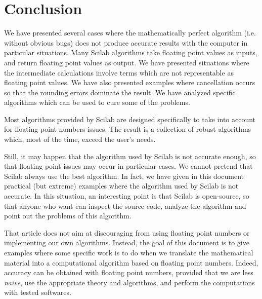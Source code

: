 %

\section{Conclusion}

We have presented several cases where the mathematically perfect 
algorithm (i.e. without obvious bugs) does not produce accurate results 
with the computer in particular situations.
Many Scilab algorithms take floating point values as inputs,
and return floating point values as output. We have presented situations 
where the intermediate calculations involve terms which are 
not representable as floating point values. We have also presented 
examples where cancellation occurs so that the rounding errors dominate 
the result. We have analyzed specific algorithms which can be used to 
cure some of the problems. 

Most algorithms provided by Scilab are designed specifically to take into 
account for floating point numbers issues. The result is a collection of 
robust algorithms which, most of the time, exceed the user's needs.

Still, it may happen that the algorithm used by Scilab is not accurate enough,
so that floating point issues may occur in particular cases. We cannot 
pretend that Scilab always use the best algorithm. In fact, we have 
given in this document practical (but extreme) examples where the 
algorithm used by Scilab is not accurate. In this situation, an 
interesting point is that Scilab is open-source, so that anyone who want 
can inspect the source code, analyze the algorithm and point out the 
problems of this algorithm.

That article does not aim at discouraging from 
using floating point numbers or implementing our own algorithms.
Instead, the goal of this document is to give examples where 
some specific work is to do when we translate the 
mathematical material into a computational algorithm based on floating 
point numbers. Indeed, accuracy can be obtained with floating point numbers, 
provided that we are less \emph{naive}, use the appropriate theory and algorithms, and perform 
the computations with tested softwares.

